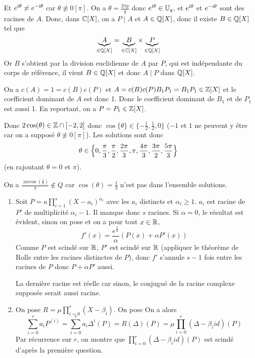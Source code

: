 \begin{solution}
\begin{enumerate}
		Et $e^{\mathrm{i}\theta}\neq e^{-\mathrm{i}\theta}$ car $\theta\not\equiv0[\pi]$. On a $\theta=\frac{2\pi p}{q}$ donc $e^{\mathrm{i}\theta}\in \mathbb{U}_{q}$, et $e^{\mathrm{i}\theta}$ et $e^{-\mathrm{i}\theta}$ sont des racines de $A$. Donc, dans $\mathbb{C}[X]$, on a $P\mid A$ et $A\in\mathbb{Q}[X]$, donc il existe $B\in\mathbb{Q}[X]$ tel que 
		$$\underbrace{A}_{\in\mathbb{Q}[X]}=\underbrace{B}_{\in\mathbb{C}[X]}\times\underbrace{P}_{\in\mathbb{Q}[X]}$$
		Or $B$ s'obtient par la division euclidienne de $A$ par $P$, qui est indépendante du corps de référence, il vient $B\in\mathbb{Q}[X]$ et donc $A\mid P$ dans $\mathbb{Q}[X]$.

		On a $c(A)=1=c(B)c(P)$ et $A=c(B)c(P)B_{1}P_{1}=B_{1}P_{1}\in\mathbb{Z}[X]$ et le coefficient dominant de $A$ est donc 1. Donc le coefficient dominant de $B_{1}$ et de $P_{1}$ est aussi 1. En reportant, on a $P=P_{1}\in\mathbb{Z}[X]$.

		Donc $2\cos(\theta)\in\mathbb{Z}\cap[-2,2]$ donc $\cos\{\theta\}\in\{-\frac{1}{2},\frac{1}{2},0\}$ ($-1$ et $1$ ne peuvent y être car on a supposé $\theta\not\equiv0[\pi]$). Les solutions sont donc 
		$$\theta\in\Bigl\{0,\frac{\pi}{3},\frac{\pi}{2},\frac{2\pi}{3},\pi,\frac{4\pi}{3},\frac{3\pi}{2},\frac{5\pi}{3}\Bigr\}$$
		(en rajoutant $\theta=0$ et $\pi$).
	\end{enumerate}
\end{solution}

\begin{remark}
	On a $\frac{\arccos(\frac{1}{3})}{\pi}\notin Q$ car $\cos(\theta)=\frac{1}{3}$ n'est pas dans l'ensemble solutions.
\end{remark}

\begin{solution}
	\phantom{}
	\begin{enumerate}
		\item Soit $P=a\prod_{i=1}^{s}(X-a_{i})^{\alpha_{i}}$ avec les $a_{i}$ distincts et $\alpha_{i}\geqslant1$. $a_{i}$ est racine de $P'$ de multiplicité $\alpha_{i}-1$. Il manque donc $s$ racines. Si $\alpha=0$, le résultat est évident, sinon on pose 
		et on a pour tout $x\in\mathbb{R}$,
		$$f'(x)=\frac{e^{\frac{x}{\alpha}}}{\alpha}(P(x)+\alpha P'(x))$$
		Comme $P$ est scindé sur $\mathbb{R}$, $P'$ est scindé sur $\mathbb{R}$ (appliquer le théorème de Rolle entre les racines distinctes de $P$), donc $f'$ s'annule $s-1$ fois entre les racines de $P$ donc $P+\alpha P'$ aussi. 

		La dernière racine est réelle car sinon, le conjugué de la racine complexe supposée serait aussi racine.

		\item On pose $R=\mu\prod_{i=0}^{r}(X-\beta_{i})$. On pose 
		On a alors 
		$$\sum_{i=0}^{r}a_{i}P^{(i)}=\sum_{i=0}^{r}a_{i}\Delta^{i}(P)=R(\Delta)(P)=\mu\prod_{i=0}^{r}(\Delta-\beta_{i}id)(P)$$
		Par récurrence sur $r$, on montre que $\prod_{i=0}^{r}(\Delta-\beta_{i}id)(P)$ est scindé d'après la première question.
	\end{enumerate}
\end{solution}

